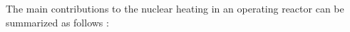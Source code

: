 The main contributions to the nuclear heating in an operating reactor can be summarized as follows \cite{lemaire_estimation_2015}:
